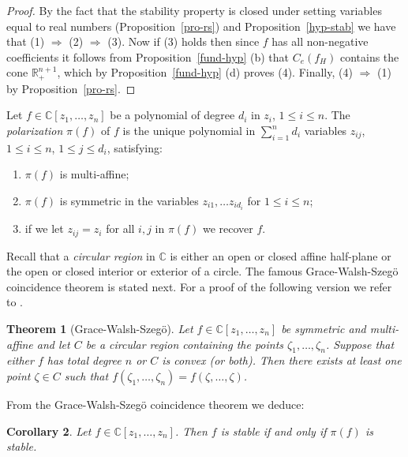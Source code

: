 \documentclass[10pt,reqno]{amsart}
\theoremstyle{plain}
\newtheorem{theorem}{Theorem}[section]
\newtheorem{corollary}[theorem]{Corollary}
\theoremstyle{definition}
\theoremstyle{remark}
\newcommand{\RR}{\mathbb{R}}
\newcommand{\CC}{\mathbb{C}}
\begin{document}
\begin{proof}
By the fact that the stability property is 
closed under setting variables equal to real numbers 
(Proposition~\ref{pro-rs}) and Proposition~\ref{hyp-stab} we have that 
(1) $\Rightarrow$ (2) $\Rightarrow$ (3). 
Now if (3) holds then since $f$ has all non-negative coefficients it follows
from Proposition~\ref{fund-hyp} (b) that 
$C_e(f_H)$ contains the cone $\RR_+^{n+1}$, which by 
Proposition~\ref{fund-hyp} (d) proves (4). Finally, 
(4) $\Rightarrow$ (1) by Proposition~\ref{pro-rs}.
\end{proof}

Let $f \in \CC[z_1,\ldots, z_n]$ be a polynomial of degree $d_i$ in $z_i$, 
$1\le i\le n$. The 
{\em polarization} $\pi(f)$ of $f$ is the unique polynomial in 
$\sum_{i=1}^{n}d_i$ variables 
$z_{ij}$, $1 \leq i \leq n$, $1 \leq j \leq d_i$, satisfying:
\begin{enumerate}
\item[(i)] $\pi(f)$ is multi-affine; 
\item[(ii)] $\pi(f)$ is symmetric in the variables 
$z_{i1}, \ldots z_{id_i}$ for 
$1 \leq i \leq n$;
\item[(iii)] if we let  $z_{ij}=z_i$ for all $i,j$ in $\pi(f)$ we recover $f$.
\end{enumerate}

Recall that a {\em circular region} in $\CC$ is either an open or closed 
affine half-plane or the open or closed interior or exterior of a circle. 
The famous Grace-Walsh-Szeg\"o coincidence theorem 
\cite{grace,RS,walsh} is stated next. For a proof of the following version we 
refer to \cite[Theorem 2.12]{COSW}. 

\begin{theorem}[Grace-Walsh-Szeg\"o]\label{GWS}
Let $f \in \CC[z_1,\ldots, z_n]$ be symmetric and multi-affine and let $C$ be 
a circular region 
containing the points $\zeta_1, \ldots, \zeta_n$. Suppose that either $f$
has total degree $n$ or $C$ is convex (or both). Then there exists at least
one point 
$\zeta \in C$ such that 
$f(\zeta_1, \ldots, \zeta_n)=f(\zeta, \ldots, \zeta)$.

\end{theorem}
From the Grace-Walsh-Szeg\"o coincidence theorem we deduce:

\begin{corollary}\label{polarizeit}
Let $f \in \CC[z_1,\ldots, z_n]$. Then 
$f$ is stable if and only if $\pi(f)$ is stable. 
\end{corollary}
\end{document}
